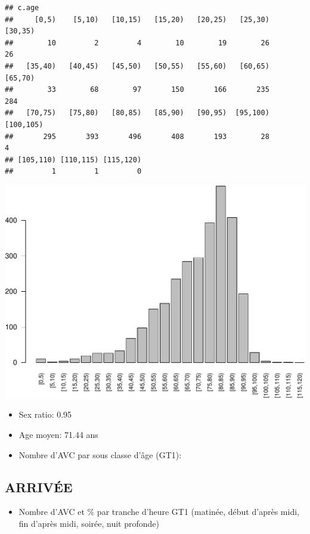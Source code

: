 \documentclass[]{article}
\begin{document}
\begin{verbatim}
## c.age
##     [0,5)    [5,10)   [10,15)   [15,20)   [20,25)   [25,30)   [30,35) 
##        10         2         4        10        19        26        26 
##   [35,40)   [40,45)   [45,50)   [50,55)   [55,60)   [60,65)   [65,70) 
##        33        68        97       150       166       235       284 
##   [70,75)   [75,80)   [80,85)   [85,90)   [90,95)  [95,100) [100,105) 
##       295       393       496       408       193        28         4 
## [105,110) [110,115) [115,120) 
##         1         1         0
\end{verbatim}

\includegraphics{rapport2014_V4_files/figure-latex/patients-1.pdf}

\begin{itemize}
\itemsep1pt\parskip0pt
\item
  Sex ratio: 0.95
\item
  Age moyen: 71.44 ans
\item
  Nombre d'AVC par sous classe d'âge (GT1):
\end{itemize}

\subsection{ARRIVÉE}\label{arrivee-2}

\begin{itemize}
\itemsep1pt\parskip0pt
\item
  Nombre d'AVC et \% par tranche d'heure GT1 (matinée, début d'après
  midi, fin d'après midi, soirée, nuit profonde)
\end{itemize}
\end{document}
